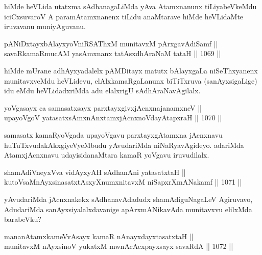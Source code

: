 \begin{artha}
hiMde heVLida utatxma sAdhanagaLiMda yAva Atamxnanunx tiLiyabeVkeMdu iciCxsuvaroV A paramAtamxnanenx tiLidu anaMtarave hiMde heVLidaMte iruvavanu muniyAguvanu.
\end{artha}


\begin{shl}
pANiDxtayxbAlayxyoVniRSAThxM munitavxM pArxgavAdiSamf || \\
savaRkamaRmucAM yasAmxnanx tatAsxdhAraNaM tataH \hfill || 1069 ||  
\end{shl}

\begin{artha}
hiMde mUrane adhAyxyadalelx pAMDitayx matutx bAlayxgaLa niSeThxyanenx munitavxveMdu heVLidevu, elAlxkamaRgaLanunx biTiTxruva (sanAyxsigaLige) idu eMdu heVLidadxriMda adu elalxrigU sAdhAraNavAgilalx.
\end{artha}


\begin{shl}
yoVgasayx ca samasatxsayx parxtayxgivxjAcnxnajanamxneV || \\
upayoVgoV yatasatxsAmxnAnx\s \s tamxjAcnxnoVdayAtapxraH \hfill || 1070 ||  
\end{shl}

\begin{artha}
samasatx kamaRyoVgada upayoVgavu parxtayxgAtamxna jAcnxnavu huTuTxvudakAkxgiyeVyeMbudu yAvudariMda niNaRyavAgideyo. adariMda AtamxjAcnxnavu udayisidanaMtara kamaR yoVgavu iruvudilalx.
\end{artha}

\begin{shl}
shamAdiVneyxVva vidAyxyAH sAdhanAni yatasatxtaH || \\
kutoV\s saMnAyxsinasatxtAsxyXnumxnitavxM niSapxrXmANakamf \hfill || 1071 ||  
\end{shl}

\begin{artha}
yAvudariMda jAcnxnakekx sAdhanavAdadudx shamAdiguNagaLeV Agiruvavo, AdudariMda sanAyxsiyalalxdavanige apArxmANikavAda munitavxvu elilxMda barabeVku?
\end{artha}

\begin{shl}
mananAtamxkameVvAsayx kamaR nAnayxdayxtasatxtaH || \\
munitavxM nAyxsinoV yukatxM mwnAcAcxpayxsayx savaRdA \hfill || 1072 ||  
\end{shl}

